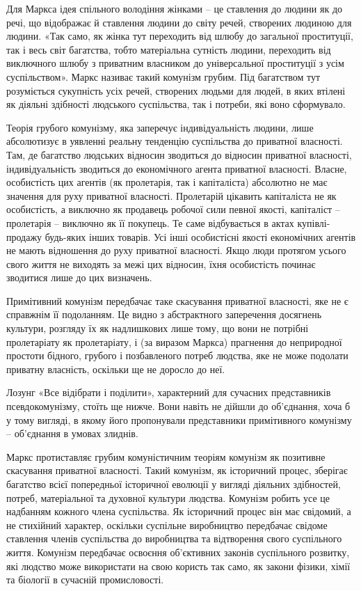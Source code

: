 \documentclass[../main]{subfiles}
\begin{document}
Для Маркса ідея спільного володіння жінками – це ставлення до людини як до речі, що відображає й ставлення людини до світу речей, створених людиною для людини. «Так само, як жінка тут переходить від шлюбу до загальної проституції, так і весь світ багатства, тобто матеріальна сутність людини, переходить від виключного шлюбу з приватним власником до універсальної проституції з усім суспільством». Маркс називає такий комунізм грубим. Під багатством тут розуміється сукупність усіх речей, створених людьми для людей, в яких втілені як діяльні здібності людського суспільства, так і потреби, які воно сформувало.

Теорія грубого комунізму, яка заперечує індивідуальність людини, лише абсолютизує в уявленні реальну тенденцію суспільства до приватної власності. Там, де багатство людських відносин зводиться до відносин приватної власності, індивідуальність зводиться до економічного агента приватної власності. Власне, особистість цих агентів (як пролетарія, так і капіталіста) абсолютно не має значення для руху приватної власності. Пролетарій цікавить капіталіста не як особистість, а виключно як продавець робочої сили певної якості, капіталіст – пролетарія – виключно як її покупець. Те саме відбувається в актах купівлі-продажу будь-яких інших товарів. Усі інші особистісні якості економічних агентів не мають відношення до руху приватної власності. Якщо люди протягом усього свого життя не виходять за межі цих відносин, їхня особистість починає зводитися лише до цих визначень.

Примітивний комунізм передбачає таке скасування приватної власності, яке не є справжнім її подоланням. Це видно з абстрактного заперечення досягнень культури, розгляду їх як надлишкових лише тому, що вони не потрібні пролетаріату як пролетаріату, і (за виразом Маркса) прагнення до неприродної простоти бідного, грубого і позбавленого потреб людства, яке не може подолати приватну власність, оскільки ще не доросло до неї.

Лозунг «Все відібрати і поділити», характерний для сучасних представників псевдокомунізму, стоїть ще нижче. Вони навіть не дійшли до об’єднання, хоча б у тому вигляді, в якому його пропонували представники примітивного комунізму – об’єднання в умовах злиднів.

Маркс протиставляє грубим комуністичним теоріям комунізм як позитивне скасування приватної власності. Такий комунізм, як історичний процес, зберігає багатство всієї попередньої історичної еволюції у вигляді діяльних здібностей, потреб, матеріальної та духовної культури людства. Комунізм робить усе це надбанням кожного члена суспільства. Як історичний процес він має свідомий, а не стихійний характер, оскільки суспільне виробництво передбачає свідоме ставлення членів суспільства до виробництва та відтворення свого суспільного життя. Комунізм передбачає освоєння об’єктивних законів суспільного розвитку, які людство може використати на свою користь так само, як закони фізики, хімії та біології в сучасній промисловості.
\end{document}
